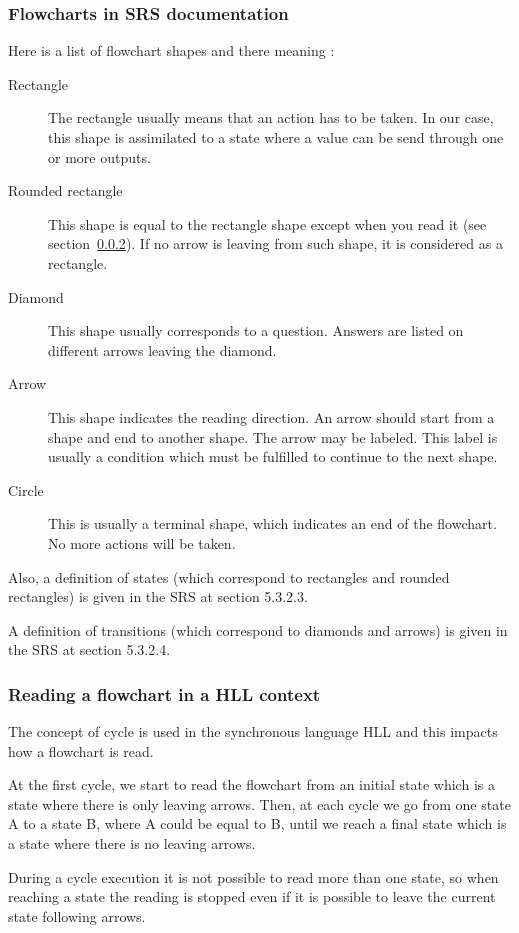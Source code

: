 \subsubsection{Flowcharts in SRS documentation}
\label{flowchart-definition}
Here is a list of flowchart shapes and there meaning :
\begin{description}
\item[Rectangle] The rectangle usually means that an action has to be
  taken. In our case, this shape is assimilated to a state where a
  value can be send through one or more outputs.
\item[Rounded rectangle] This shape is equal to the rectangle shape
  except when you read it (see section~\ref{reading-a-flowchart}). If
  no arrow is leaving from such shape, it is considered as a
  rectangle.
\item[Diamond] This shape usually corresponds to a question. Answers
  are listed on different arrows leaving the diamond.
\item[Arrow] This shape indicates the reading direction. An arrow
  should start from a shape and end to another shape. The arrow may be
  labeled. This label is usually a condition which must be fulfilled
  to continue to the next shape.
\item[Circle] This is usually a terminal shape, which indicates an end
  of the flowchart. No more actions will be taken.
\end{description}

Also, a definition of states (which correspond to rectangles and
rounded rectangles) is given in the SRS at section 5.3.2.3.

A definition of transitions (which correspond to diamonds and arrows)
is given in the SRS at section 5.3.2.4.

\subsubsection{Reading a flowchart in a HLL context}
\label{reading-a-flowchart}
The concept of cycle is used in the synchronous language HLL and this
impacts how a flowchart is read.

At the first cycle, we start to read the flowchart from an initial
state which is a state where there is only leaving arrows. Then, at
each cycle we go from one state A to a state B, where A could be equal
to B, until we reach a final state which is a state where there is no
leaving arrows.

During a cycle execution it is not possible to read more than one
state, so when reaching a state the reading is stopped even if it is
possible to leave the current state following arrows. 

